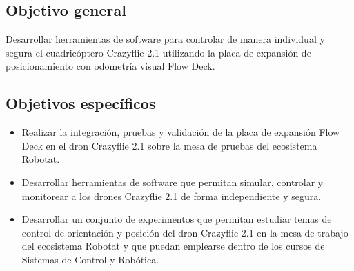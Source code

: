 \subsection*{Objetivo general}
Desarrollar herramientas de software para controlar de manera individual y segura el cuadricóptero Crazyflie 2.1 utilizando la placa de expansión de posicionamiento con odometría visual Flow Deck.

\subsection*{Objetivos específicos}
\begin{itemize}
	\item Realizar la integración, pruebas y validación de la placa de expansión Flow Deck en el dron Crazyflie 2.1 sobre la mesa de pruebas del ecosistema Robotat.  
	\item Desarrollar herramientas de software que permitan simular, controlar y monitorear a los drones Crazyflie 2.1 de forma independiente y segura.
	\item Desarrollar un conjunto de experimentos que permitan estudiar temas de control de orientación y posición del dron Crazyflie 2.1 en la mesa de trabajo del ecosistema Robotat y que puedan emplearse dentro de los cursos de Sistemas de Control y Robótica. 
\end{itemize}
